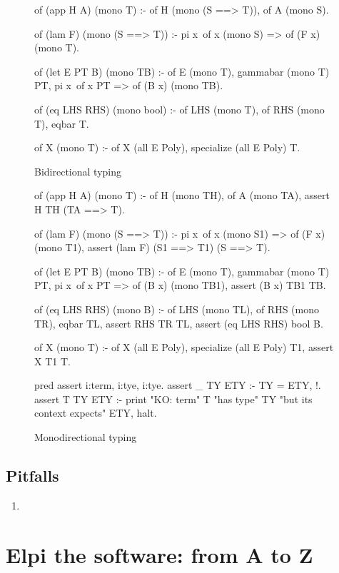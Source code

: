 \documentclass[a4paper, 11pt]{book}
\begin{document}
\begin{figure}
\begin{elpicode}
of (app H A) (mono T) :-
  of H (mono (S ==> T)),
  of A (mono S).

of (lam F) (mono (S ==> T)) :-
  pi x\ of x (mono S) => of (F x) (mono T).

of (let E PT B) (mono TB) :-
  of E (mono T),
  gammabar (mono T) PT,
  pi x\ of x PT => of (B x) (mono TB).

of (eq LHS RHS) (mono bool) :-
  of LHS (mono T),
  of RHS (mono T),
  eqbar T.

of X (mono T) :- of X (all E Poly), specialize (all E Poly) T.
\end{elpicode}
\caption[bidirectional]{Bidirectional typing\label{hm:bidir}}
\end{figure}

\begin{figure}
\begin{elpicode}
of (app H A) (mono T) :-
  of H (mono TH),
  of A (mono TA),
  assert H TH (TA ==> T).

of (lam F) (mono (S ==> T)) :-
  pi x\ of x (mono S1) => of (F x) (mono T1),
  assert (lam F) (S1 ==> T1) (S ==> T).

of (let E PT B) (mono TB) :-
  of E (mono T),
  gammabar (mono T) PT,
  pi x\ of x PT => of (B x) (mono TB1),
  assert (B x) TB1 TB.

of (eq LHS RHS) (mono B) :-
  of LHS (mono TL),
  of RHS (mono TR),
  eqbar TL,
  assert RHS TR TL,
  assert (eq LHS RHS) bool B.

of X (mono T) :- of X (all E Poly), specialize (all E Poly) T1, assert X T1 T.

pred assert i:term, i:tye, i:tye.
assert _ TY ETY :- TY = ETY, !.
assert T TY ETY :-
  print "KO: term" T "has type" TY "but its context expects" ETY, halt.
\end{elpicode}
\caption[monodirectional]{Monodirectional typing\label{hm:mono}}
\end{figure}

\section{Pitfalls}

\begin{enumerate}
  \item {}
\end{enumerate}

\chapter{Elpi the software: from A to Z}
\end{document}
